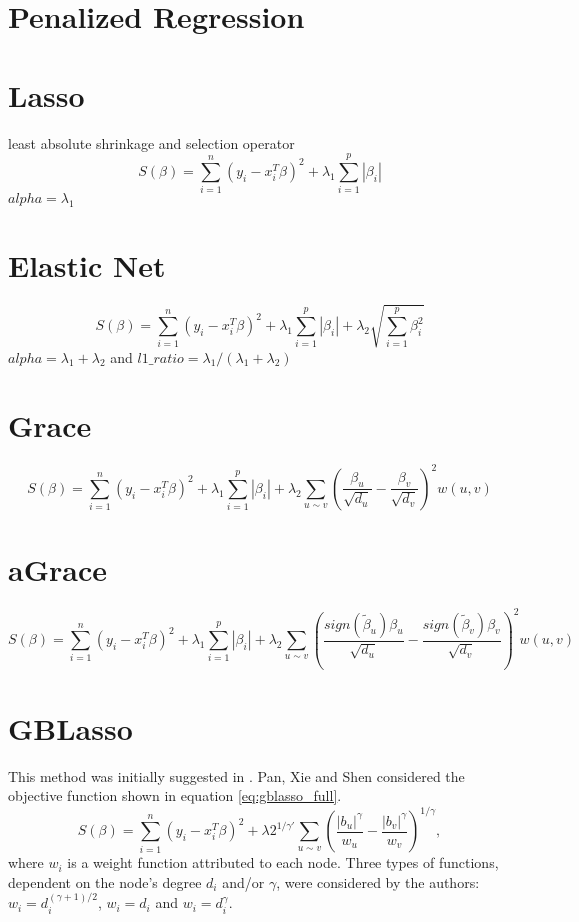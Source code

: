 \section{Penalized Regression}


\section{Lasso}
least absolute shrinkage and selection operator
\begin{equation}
S(\beta) = \sum_{i=1}^{n} (y_i - x_i^T\beta)^2 + \lambda_1\sum_{i=1}^{p}\left|\beta_i\right|
\end{equation}
$alpha = \lambda_1$


\section{Elastic Net}
\begin{equation}
S(\beta) = \sum_{i=1}^{n} (y_i - x_i^T\beta)^2 + \lambda_1\sum_{i=1}^{p}\left|\beta_i\right| + \lambda_2\sqrt{\sum_{i=1}^{p}\beta_i^2}
\end{equation}
$alpha = \lambda_1 + \lambda_2$ and $l1\_ratio = \lambda_1/(\lambda_1+\lambda_2)$


\section{Grace}
\begin{equation}
S(\beta) = \sum_{i=1}^{n} (y_i - x_i^T\beta)^2 + \lambda_1\sum_{i=1}^{p}\left|\beta_i\right| + \lambda_2\sum_{u \sim v}\left(\frac{\beta_u}{\sqrt{d_u}}-\frac{\beta_v}{\sqrt{d_v}}\right)^2w(u,v)
\end{equation}


\section{aGrace}
\begin{equation}
S(\beta) = \sum_{i=1}^{n} (y_i - x_i^T\beta)^2 + \lambda_1\sum_{i=1}^{p}\left|\beta_i\right| + \lambda_2\sum_{u \sim v}\left(\frac{sign(\tilde{\beta}_u)\beta_u}{\sqrt{d_u}}-\frac{sign(\tilde{\beta}_v)\beta_v}{\sqrt{d_v}}\right)^2w(u,v)
\end{equation}


\section{GBLasso} \label{sec:gblasso}
This method was initially suggested in \cite{pan2010incorporating}. Pan, Xie and Shen considered the objective function shown in equation \ref{eq:gblasso_full}. 
\begin{equation} \label{eq:gblasso_full}
S(\beta) = \sum_{i=1}^{n} (y_i - x_i^T\beta)^2 + \lambda2^{1/\gamma'}\sum_{u \sim v}\left(\frac{|b_u|^\gamma}{w_u}-\frac{|b_v|^\gamma}{w_v}\right)^{1/\gamma},
\end{equation}
where $w_i$ is a weight function attributed to each node. Three types of functions, dependent on the node's degree $d_i$ and/or $\gamma$, were considered by the authors: $w_i = d_i^{(\gamma+1)/2}$, $w_i = d_i$ and $w_i = d_i^\gamma$.

